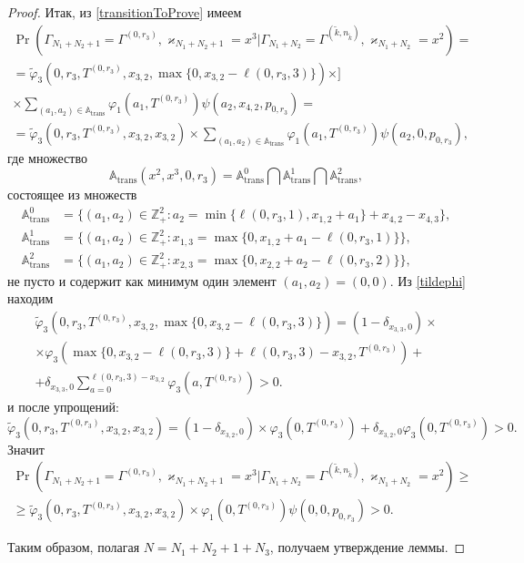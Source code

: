 \documentclass[a4paper,12pt,russian]{extarticle}
\begin{document}
\begin{proof}
Итак, из \eqref{transitionToProve} имеем
\begin{multline*}
\Pr(\Gamma_{N_1+N_2+1}=\Gamma^{(0,r_3)}, \varkappa_{N_1+N_2+1}=x^{3}|
\Gamma_{N_1+N_2}=\Gamma^{(\tilde{k},n_{\tilde{k}})}, \varkappa_{N_1+N_2}=x^2)=\\
=\widetilde{\varphi}_3(0,r_3,T^{(0,r_3)},x_{3,2},\max{\{0,x_{3,2} - \ell(0,r_3,3)\}}) \times]\\ \times
\sum_{(a_1,a_2)\in {\mathbb A}_{\mathrm{trans}}}\varphi_1(a_1,T^{(0,r_3)})  \psi(a_2,x_{4,2}, p_{0,r_3}) =\\
=\widetilde{\varphi}_3(0,r_3,T^{(0,r_3)},x_{3,2},x_{3,2}) \times
\sum_{(a_1,a_2)\in {\mathbb A}_{\mathrm{trans}}}\varphi_1(a_1,T^{(0,r_3)})  \psi(a_2,0, p_{0,r_3}),
\end{multline*}
где множество 
\begin{equation*}
{\mathbb A}_{\mathrm{trans}}(x^2,x^{3},0,r_3) = {\mathbb A}_{\mathrm{trans}}^0 \bigcap {\mathbb A}_{\mathrm{trans}}^1\bigcap {\mathbb A}_{\mathrm{trans}}^2,
\end{equation*}
состоящее из множеств 
\begin{align*}
{\mathbb A}_{\mathrm{trans}}^0 &= \{(a_1,a_2) \in \mathbb{Z}_+^2 \colon a_2 = \min{\{\ell(0,r_3,1), x_{1,2}+a_1}\} +x_{4,2}- x_{4,3}\},\\
{\mathbb A}_{\mathrm{trans}}^1 &= \{(a_1,a_2) \in \mathbb{Z}_+^2 \colon x_{1,3}=\max{\{0,x_{1,2}+a_1-\ell(0,r_3,1)\}}\},\\
 {\mathbb A}_{\mathrm{trans}}^2 &= \{(a_1,a_2) \in \mathbb{Z}_+^2 \colon  x_{2,3} =\max{\{0,x_{2,2}+a_2-\ell(0,r_3,2)\}}\},
\end{align*}
не пусто и содержит как минимум один элемент $(a_1,a_2)=(0,0)$. Из \eqref{tildephi} находим
\begin{multline*}
\widetilde{\varphi}_3(0,r_3,T^{(0,r_3)},x_{3,2},\max{\{0,x_{3,2} - \ell(0,r_3,3)\}})= (1-\delta_{x_{3,3},0}) \times \\\times\varphi_3(\max{\{0,x_{3,2} - \ell(0,r_3,3)\}} + \ell (0,r_3,3) - x_{3,2},T^{(0,r_3)} ) 
+\\+\delta_{x_{3,3},0} \sum_{a=0}^{\ell(0,r_3,3)-x_{3,2}}\varphi_3 (a,T^{(0,r_3)})>0.
\end{multline*}
и после упрощений:
\begin{equation*}
\widetilde{\varphi}_3(0,r_3,T^{(0,r_3)},x_{3,2},x_{3,2})= (1-\delta_{x_{3,2},0}) \times \varphi_3(0,T^{(0,r_3)} ) 
+\delta_{x_{3,2},0} \varphi_3 (0,T^{(0,r_3)})>0.
\end{equation*}
Значит
\begin{multline*}
\Pr(\Gamma_{N_1+N_2+1}=\Gamma^{(0,r_3)}, \varkappa_{N_1+N_2+1}=x^{3}|
\Gamma_{N_1+N_2}=\Gamma^{(\tilde{k},n_{\tilde{k}})}, \varkappa_{N_1+N_2}=x^2)\geqslant \\
\geqslant \widetilde{\varphi}_3(0,r_3,T^{(0,r_3)},x_{3,2},x_{3,2})
\times
\varphi_1(0,T^{(0,r_3)})  \psi(0,0, p_{0,r_3}) > 0.
\end{multline*}

Таким образом, полагая $N=N_1+N_2+1+N_3$, получаем утверждение леммы.
\end{proof}
\end{document}
